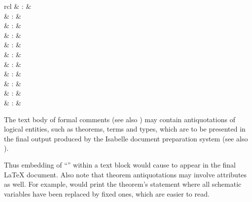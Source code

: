 \begin{isabellebody}
\begin{isamarkuptext}
\begin{matharray}{rcl}
     & : & \isarantiq \\
     & : & \isarantiq \\
     & : & \isarantiq \\
     & : & \isarantiq \\
     & : & \isarantiq \\
     & : & \isarantiq \\
     & : & \isarantiq \\
     & : & \isarantiq \\
     & : & \isarantiq \\
     & : & \isarantiq \\
     & : & \isarantiq \\
  \end{matharray}

  The text body of formal comments (see also )
  may contain antiquotations of logical entities, such as theorems,
  terms and types, which are to be presented in the final output
  produced by the Isabelle document preparation system (see also
  ).

  Thus embedding of ``''
  within a text block would cause
   to appear in the final {\LaTeX} document.  Also note that theorem
  antiquotations may involve attributes as well.  For example,
   would print the theorem's
  statement where all schematic variables have been replaced by fixed
  ones, which are easier to read.


\end{isamarkuptext}
\end{isabellebody}
